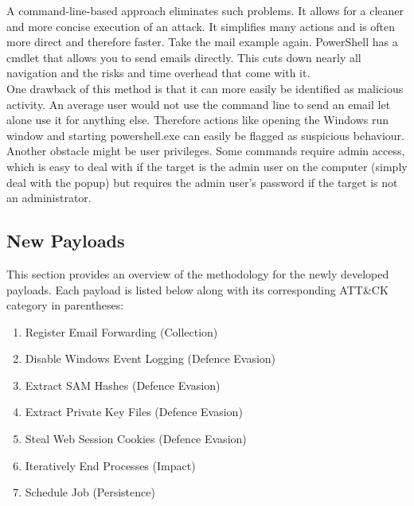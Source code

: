 A command-line-based approach eliminates such problems. It allows for a cleaner and more concise execution of an attack. It simplifies many actions and is often more direct and therefore faster. Take the mail example again. PowerShell has a cmdlet that allows you to send emails directly. This cuts down nearly all navigation and the risks and time overhead that come with it. \\
One drawback of this method is that it can more easily be identified as malicious activity. An average user would not use the command line to send an email let alone use it for anything else. Therefore actions like opening the Windows run window and starting powershell.exe can easily be flagged as suspicious behaviour. Another obstacle might be user privileges. Some commands require admin access, which is easy to deal with if the target is the admin user on the computer (simply deal with the popup) but requires the admin user's password if the target is not an administrator. 


\subsection{New Payloads}

This section provides an overview of the methodology for the newly developed payloads. Each payload is listed below along with its corresponding ATT\&CK category in parentheses:
\begin{enumerate}
    \item Register Email Forwarding (Collection)
    \item Disable Windows Event Logging (Defence Evasion)
    \item Extract SAM Hashes (Defence Evasion)
    \item Extract Private Key Files (Defence Evasion)
    \item Steal Web Session Cookies (Defence Evasion)
    \item Iteratively End Processes (Impact)
    \item Schedule Job (Persistence)
\end{enumerate}


